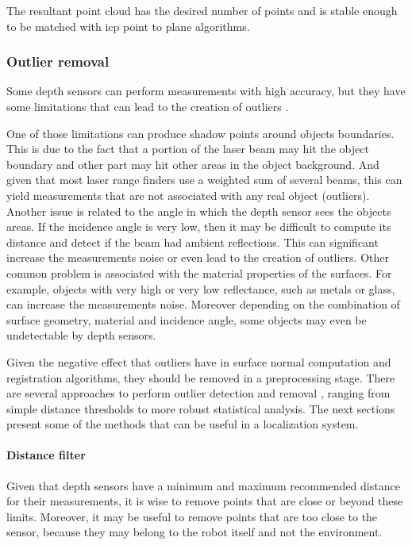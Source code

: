 The resultant point cloud has the desired number of points and is stable enough to be matched with \gls{icp} point to plane algorithms.


\subsubsection{Outlier removal}

Some depth sensors can perform measurements with high accuracy, but they have some limitations that can lead to the creation of outliers \cite{Sotoodeh2006}.

One of those limitations can produce shadow points around objects boundaries. This is due to the fact that a portion of the laser beam may hit the object boundary and other part may hit other areas in the object background. And given that most laser range finders use a weighted sum of several beams, this can yield measurements that are not associated with any real object (outliers). Another issue is related to the angle in which the depth sensor sees the objects areas. If the incidence angle is very low, then it may be difficult to compute its distance and detect if the beam had ambient reflections. This can significant increase the measurements noise or even lead to the creation of outliers. Other common problem is associated with the material properties of the surfaces. For example, objects with very high or very low reflectance, such as metals or glass, can increase the measurements noise. Moreover depending on the combination of surface geometry, material and incidence angle, some objects may even be undetectable by depth sensors.

Given the negative effect that outliers have in surface normal computation and registration algorithms, they should be removed in a preprocessing stage. There are several approaches to perform outlier detection and removal \cite{YangZhang2010}, ranging from simple distance thresholds to more robust statistical analysis. The next sections present some of the methods that can be useful in a localization system.


\paragraph{Distance filter}

Given that depth sensors have a minimum and maximum recommended distance for their measurements, it is wise to remove points that are close or beyond these limits. Moreover, it may be useful to remove points that are too close to the sensor, because they may belong to the robot itself and not the environment.

